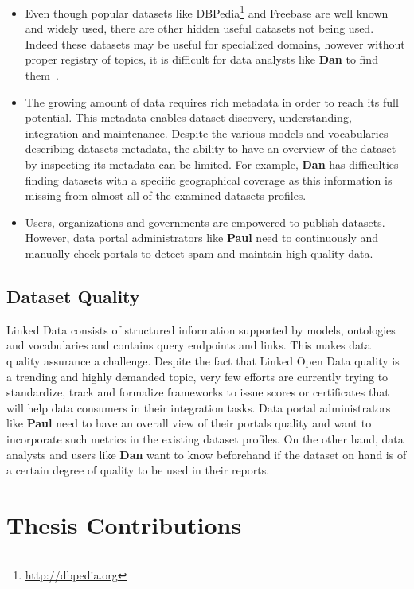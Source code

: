 \begin{itemize}
	\item Even though popular datasets like DBPedia\footnote{\url{http://dbpedia.org}} and Freebase are well known and widely used, there are other hidden useful datasets not being used. Indeed these datasets may be useful for specialized domains, however without proper registry of topics, it is difficult for data analysts like \textbf{Dan} to find them~\cite{Lalithsena:WI:13}.
	\item The growing amount of data requires rich metadata in order to reach its full potential. This metadata enables dataset discovery, understanding, integration and maintenance. Despite the various models and vocabularies describing datasets metadata, the ability to have an overview of the dataset by inspecting its metadata can be limited. For example, \textbf{Dan} has difficulties finding datasets with a specific geographical coverage as this information is missing from almost all of the examined datasets profiles.
	\item Users, organizations and governments are empowered to publish datasets. However, data portal administrators like \textbf{Paul} need to continuously and manually check portals to detect spam and maintain high quality data.
\end{itemize}

\subsection{Dataset Quality}

Linked Data consists of structured information supported by models, ontologies and vocabularies and contains query endpoints and links. This makes data quality assurance a challenge. Despite the fact that Linked Open Data quality is a trending and highly demanded topic, very few efforts are currently trying to standardize, track and formalize frameworks to issue scores or certificates that will help data consumers in their integration tasks. Data portal administrators like \textbf{Paul} need to have an overall view of their portals quality and want to incorporate such metrics in the existing dataset profiles. On the other hand, data analysts and users like \textbf{Dan} want to know beforehand if the dataset on hand is of a certain degree of quality to be used in their reports.

\section{Thesis Contributions} \label{section:contribution}

